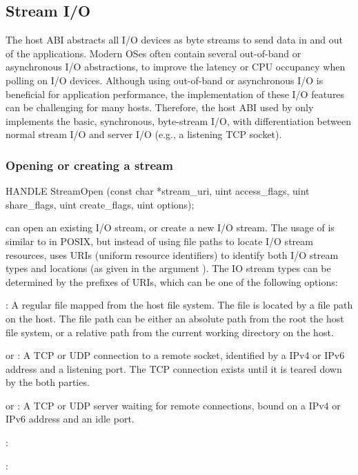 \subsection{Stream I/O}
\label{sec:abi:streams}


The host ABI abstracts all I/O devices as byte streams to send data in and out of the applications.
Modern OSes often contain several out-of-band or asynchronous I/O abstractions, to improve the latency or CPU occupancy when polling on I/O devices.
Although using out-of-band or asynchronous I/O is beneficial for application performance, the implementation of these I/O features can be challenging for many hosts.
Therefore, the host ABI used by \graphene{} only implements the basic, synchronous, byte-stream I/O,
with differentiation between normal stream I/O and server I/O (e.g., a listening TCP socket).  

\subsubsection*{Opening or creating a stream}


\begin{paldef}
HANDLE StreamOpen (const char *stream_uri,
                   uint access_flags, uint share_flags,
                   uint create_flags, uint options);
\end{paldef}


 can open an existing I/O stream, or create a new I/O stream.
The usage of  is similar to  in POSIX,
but instead of using file paths to locate I/O stream resources,  uses URIs (uniform resource identifiers) to identify both I/O stream types and locations (as given in the argument ).
The IO stream types can be determined by the {\rm prefixes} of URIs, which can be one of the following options:

\begin{compactitem}
\item {}: A regular file mapped from the host file system. The file is located by a file path on the host. The file path can be either an absolute path from the root the host file system, or a relative path from the current working directory on the host.
\item {} or : A TCP or UDP connection to a remote socket, identified by a IPv4 or IPv6 address and a listening port. The TCP connection exists until it is teared down by the both parties.
\item {} or : A TCP or UDP server waiting for remote connections, bound on a IPv4 or IPv6 address and an idle port.
\item {}:
\item {}:
\end{compactitem}

